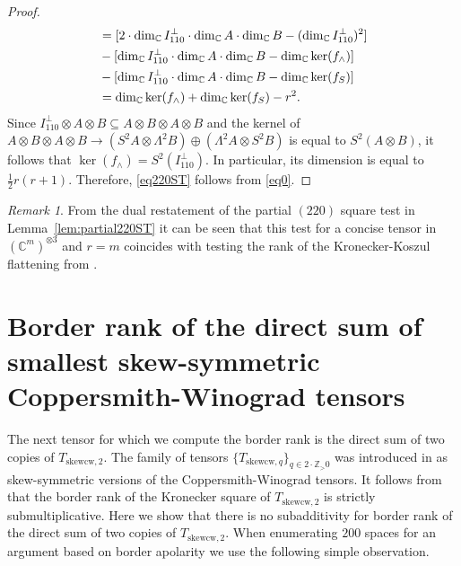 \documentclass[12pt]{amsart}
\theoremstyle{definition}
\theoremstyle{remark}
\newtheorem{remark}[theorem]{Remark}
\theoremstyle{definition}
\newcommand{\CC}{\mathbb{C}}
\begin{document}
\begin{proof}
\begin{align}
  &=[2\cdot \dim_\CC I_{110}^\perp \cdot \dim_\CC A\cdot  \dim_\CC B-(\dim_\CC I_{110}^\perp)^2] \notag\\
  &- [\dim_\CC I_{110}^\perp \cdot \dim_\CC A \cdot \dim_\CC B - \dim_\CC \ker (f_\wedge)]  \label{eq0}\\
  &- [\dim_\CC I_{110}^\perp \cdot \dim_\CC A \cdot \dim_\CC B - \dim_\CC \ker (f_S)] \notag\\
  &= \dim_\CC \ker (f_\wedge) + \dim_\CC \ker (f_S) - r^2. \notag 
\end{align}
 Since $I_{110}^\perp \otimes A\otimes B \subseteq A\otimes B\otimes A\otimes B$ and the kernel of $A\otimes B\otimes A\otimes B \to (S^2 A\otimes \Lambda^2 B) \oplus (\Lambda^2 A\otimes S^2 B)$ is equal to $S^2(A\otimes B)$, it follows that $\ker (f_\wedge) = S^2(I_{110}^\perp)$. In particular, its dimension is equal to $\frac{1}{2}r(r+1)$. Therefore, \eqref{eq220ST} follows from \eqref{eq0}.
\end{proof}


\begin{remark}
From the dual restatement of the partial $(220)$ square test in Lemma~\ref{lem:partial220ST} it can be seen that this test for a concise tensor in $(\CC^m)^{\otimes 3}$ and $r=m$ coincides with testing the rank of the Kronecker-Koszul flattening from \cite[Example~3.7]{DM26}.
\end{remark}

\section{Border rank of the direct sum of smallest skew-symmetric Coppersmith-Winograd tensors}


The next tensor for which we compute the border rank is the direct sum of two copies of $T_{\mathrm{skewcw},2}$. The family of tensors $\{T_{\mathrm{skewcw},q}\}_{q\in  2\cdot \mathbb{Z}_>0}$ was introduced in \cite{CGLV22} as skew-symmetric versions of the Coppersmith-Winograd tensors.
It follows from \cite[Theorem~1.6, Lemma~2.8 and Proposition~3.2]{CGLV22} that the border rank of the Kronecker square of $T_{\mathrm{skewcw},2}$ is strictly submultiplicative. Here we show that there is no subadditivity for border rank of the direct sum of two copies of $T_{\mathrm{skewcw},2}$. When enumerating $200$ spaces for an argument based on border apolarity we use the following simple observation.
\end{document}
